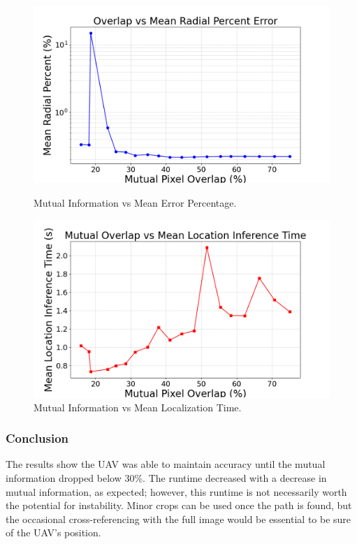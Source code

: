 \begin{figure}[H]
    \centering
    \begin{minipage}{0.48\textwidth}
        \centering
        \includegraphics[width=\textwidth]{Chapter 5/RESULTPLOTS/MUTUAL_ACC.png}
        \caption{Mutual Information vs Mean Error Percentage.}
        \label{fig:Mutual_Information_ACC}
    \end{minipage} \hfill
    \begin{minipage}{0.48\textwidth}
        \centering
        \includegraphics[width=\textwidth]{Chapter 5/RESULTPLOTS/MUTUAL_TIME.png}
        \caption{Mutual Information vs Mean Localization Time.}
        \label{fig:Mutual_Information_Time}
    \end{minipage}
\end{figure}

\subsubsection{Conclusion}
The results show the UAV was able to maintain accuracy until the mutual information dropped below 30\%. The runtime decreased with a decrease in mutual information, as expected; however, this runtime is not necessarily worth the potential for instability. Minor crops can be used once the path is found, but the occasional cross-referencing with the full image would be essential to be sure of the UAV's position. 

